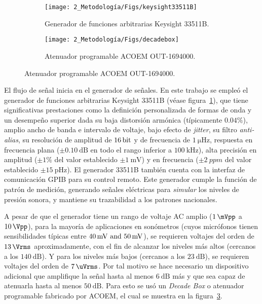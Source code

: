 \begin{figure}[!h]
    \caption{Instrumentos utilizados en la calibración periódica de sonómetros.}
    \centering
    \begin{subfigure}[t]{0.49\textwidth}
        \centering
        \texttt{[image: 2\_Metodología/Figs/keysight33511B]}
        \caption{Generador de funciones arbitrarias Keysight 33511B.}
        \label{fig:keysight_33511B}
    \end{subfigure}
    \hfill
    \begin{subfigure}[t]{0.49\textwidth}
        \centering
        \texttt{[image: 2\_Metodología/Figs/decadebox]}
        \caption{Atenuador programable ACOEM OUT-1694000.}
        \label{fig:decade_box}
    \end{subfigure}
\end{figure}
%
El flujo de señal inicia en el generador de señales.
En este trabajo se empleó el generador de funciones arbitrarias Keysight 33511B (véase figura~\ref{fig:keysight_33511B}), que tiene significativas prestaciones como la definición personalizada de formas de onda y un desempeño superior dada su baja distorsión armónica (típicamente $\num{0.04}\%$), amplio ancho de banda e intervalo de voltaje, bajo efecto de \emph{jitter}, su filtro \emph{anti-alias}, su resolución de amplitud de $\qty{16}{\bit}$ y de frecuencia de $\qty{1}{\micro\Hz}$, respuesta en frecuencia plana ($\pm\qty{0.10}{\dB}$ en todo el rango inferior a $\qty{100}{\kHz}$), alta precisión en amplitud ($\pm1\%$ del valor establecido $\pm\qty{1}{\mV}$) y en frecuencia ($\pm\qty{2}{ppm}$ del valor establecido $\pm\qty{15}{\pico\Hz}$).
El generador 33511B también cuenta con la interfaz de comunicación GPIB para su control remoto.
Este generador cumple la función de patrón de medición, generando señales eléctricas para \emph{simular} los niveles de presión sonora, y mantiene su trazabilidad a los patrones nacionales.

A pesar de que el generador tiene un rango de voltaje AC amplio ($\qty{1}{\mVpp}$ a $\qty{10}{\Vpp}$), para la mayoría de aplicaciones en sonómetros (cuyos micrófonos tienen sensibilidades típicas entre $\qtylist{40;50}{\mV}$), se requieren voltajes del orden de $\qty{13}{\Vrms}$ aproximadamente, con el fin de alcanzar los niveles más altos (cercanos a los $\qty{140}{\dB}$). Y para los niveles más bajos (cercanos a los $\qty{23}{\dB}$), se requieren voltajes del orden de $\qty{7}{\uVrms}$.
Por tal motivo se hace necesario un dispositivo adicional que amplifique la señal hasta al menos $\qty{6}{\dB}$ más y que sea capaz de atenuarla hasta al menos $\qty{50}{\dB}$.
Para esto se usó un \emph{Decade Box} o atenuador programable fabricado por ACOEM, el cual se muestra en la figura~\ref{fig:decade_box}.

